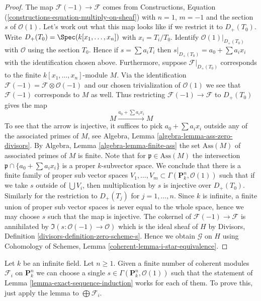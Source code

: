 \begin{proof}
The map $\mathcal{F}(-1) \to \mathcal{F}$ comes from
Constructions, Equation (\ref{constructions-equation-multiply-on-sheaf})
with $n = 1$, $m = -1$ and the section $s$ of $\mathcal{O}(1)$.
Let's work out what this map looks like if we restrict it to
$D_{+}(T_0)$. Write $D_{+}(T_0) = \Spec(k[x_1, \ldots, x_n])$
with $x_i = T_i/T_0$. Identify $\mathcal{O}(1)|_{D_{+}(T_0)}$ with
$\mathcal{O}$ using the section $T_0$. Hence if
$s = \sum a_iT_i$ then $s|_{D_{+}(T_0)} = a_0 + \sum a_ix_i$
with the identification chosen above. Furthermore, suppose
$\mathcal{F}|_{D_{+}(T_0)}$ corresponds to the finite
$k[x_1, \ldots, x_n]$-module $M$. Via the identification
$\mathcal{F}(-1) = \mathcal{F} \otimes \mathcal{O}(-1)$
and our chosen trivialization of $\mathcal{O}(1)$ we see that
$\mathcal{F}(-1)$ corresponds to $M$ as well. Thus
restricting $\mathcal{F}(-1) \to \mathcal{F}$ to $D_{+}(T_0)$ gives
the map
$$
M \xrightarrow{a_0 + \sum a_ix_i} M
$$
To see that the arrow is injective, it suffices to pick
$a_0 + \sum a_ix_i$ outside any of the associated primes of $M$, see
Algebra, Lemma \ref{algebra-lemma-ass-zero-divisors}. By
Algebra, Lemma \ref{algebra-lemma-finite-ass}
the set $\text{Ass}(M)$ of associated primes of $M$ is finite.
Note that for $\mathfrak p \in \text{Ass}(M)$ the intersection
$\mathfrak p \cap \{a_0 + \sum a_i x_i\}$ is a proper $k$-subvector space.
We conclude that there is a finite family of proper sub vector spaces
$V_1, \ldots, V_m \subset \Gamma(\mathbf{P}^n_k, \mathcal{O}(1))$
such that if we take $s$ outside of $\bigcup V_i$, then multiplication
by $s$ is injective over $D_{+}(T_0)$.
Similarly for the restriction to $D_{+}(T_j)$ for $j = 1, \ldots, n$.
Since $k$ is infinite, a finite union of proper sub vector spaces
is never equal to the whole space, hence we may choose $s$ such
that the map is injective.
The cokernel of $\mathcal{F}(-1) \to \mathcal{F}$ is annihilated
by $\Im(s : \mathcal{O}(-1) \to \mathcal{O})$ which is
the ideal sheaf of $H$ by
Divisors, Definition \ref{divisors-definition-zero-scheme-s}.
Hence we obtain $\mathcal{G}$ on $H$ using
Cohomology of Schemes, Lemma \ref{coherent-lemma-i-star-equivalence}.
\end{proof}

\begin{remark}
\label{remark-exact-sequence-induction}
Let $k$ be an infinite field. Let $n \geq 1$. Given a finite number
of coherent modules $\mathcal{F}_i$ on $\mathbf{P}^n_k$ we can choose
a single $s \in \Gamma(\mathbf{P}^n_k, \mathcal{O}(1))$ such
that the statement of Lemma \ref{lemma-exact-sequence-induction}
works for each of them.
To prove this, just apply the lemma to $\bigoplus \mathcal{F}_i$.
\end{remark}


